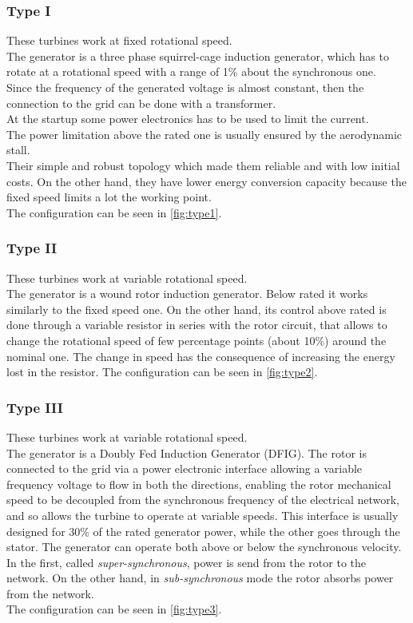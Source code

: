 \subsubsection{Type I}
These turbines work at fixed rotational speed. \\
The generator is a three phase squirrel-cage induction generator, which has to rotate at a rotational speed with a range of 1\% about the synchronous one.\\ 
Since the frequency of the generated voltage is almost constant, then the connection to the grid can be done with a transformer. \\
At the startup some power electronics has to be used to limit the current.\\
The power limitation above the rated one is usually ensured by the aerodynamic stall. \\
Their simple and robust topology which made them reliable and with low initial costs. On the other hand, they have lower energy conversion capacity because the fixed speed limits a lot the working point. \\
The configuration can be seen in \autoref{fig:type1}.

\subsubsection{Type II}
These turbines work at variable rotational speed. \\
The generator is a wound rotor induction generator. Below rated it works similarly to the fixed speed one. On the other hand, its control above rated is done through a variable resistor in series with the rotor circuit, that allows to change the rotational speed of few percentage points (about 10\%) around the nominal one. The change in speed has the consequence of increasing the energy lost in the resistor.
The configuration can be seen in \autoref{fig:type2}.

\subsubsection{Type III}
These turbines work at variable rotational speed. \\
The generator is a Doubly Fed Induction Generator (DFIG). The rotor is connected to the grid via a power electronic interface allowing a variable frequency voltage to flow in both the directions, enabling the rotor mechanical speed to be decoupled from the synchronous frequency of the electrical network, and so allows the turbine to operate at variable speeds. This interface is usually designed for 30\% of the rated generator power, while the other goes through the stator. The generator can operate both above or below the synchronous velocity. In the first, called \textit{super-synchronous}, power is send from the rotor to the network. On the other hand, in \textit{sub-synchronous} mode the rotor absorbs power from the network.\\
The configuration can be seen in \autoref{fig:type3}.

